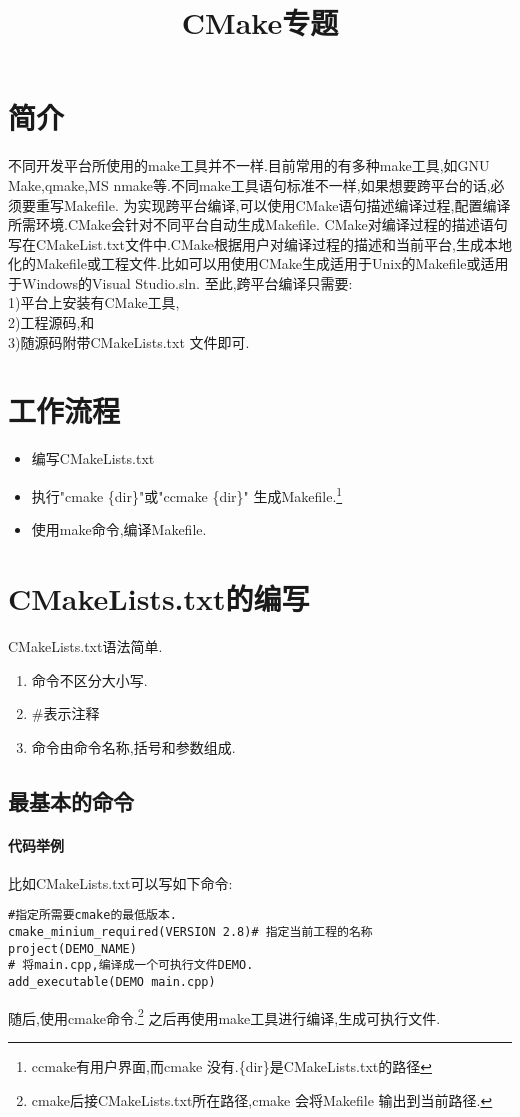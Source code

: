 \documentclass{ctexart}
\begin{document}
	
\title{CMake专题}
\author{}
\maketitle
\section{简介}
不同开发平台所使用的make工具并不一样.目前常用的有多种make工具,如GNU Make,qmake,MS nmake等.不同make工具语句标准不一样,如果想要跨平台的话,必须要重写Makefile.
为实现跨平台编译,可以使用CMake语句描述编译过程,配置编译所需环境.CMake会针对不同平台自动生成Makefile.
CMake对编译过程的描述语句写在CMakeList.txt文件中.CMake根据用户对编译过程的描述和当前平台,生成本地化的Makefile或工程文件.比如可以用使用CMake生成适用于Unix的Makefile或适用于Windows的Visual Studio.sln.
至此,跨平台编译只需要:\\
1)平台上安装有CMake工具,\\
2)工程源码,和\\
3)随源码附带CMakeLists.txt 文件即可.
\section{工作流程}
\begin{itemize}
\item 编写CMakeLists.txt
\item 执行"cmake \{dir\}"或"ccmake \{dir\}" 生成Makefile.\footnote{ccmake有用户界面,而cmake 没有.\{dir\}是CMakeLists.txt的路径}
\item 使用make命令,编译Makefile.
\end{itemize}

\section{CMakeLists.txt的编写}
CMakeLists.txt语法简单.
\begin{enumerate}
\item 命令不区分大小写.
\item \#表示注释
\item 命令由命令名称,括号和参数组成.
\end{enumerate}
\subsection{最基本的命令}
\paragraph{代码举例}
比如CMakeLists.txt可以写如下命令:
\begin{verbatim}
#指定所需要cmake的最低版本.
cmake_minium_required(VERSION 2.8)# 指定当前工程的名称
project(DEMO_NAME)
# 将main.cpp,编译成一个可执行文件DEMO.
add_executable(DEMO main.cpp)
\end{verbatim}
随后,使用cmake命令.\footnote{cmake后接CMakeLists.txt所在路径,cmake 会将Makefile 输出到当前路径.}
之后再使用make工具进行编译,生成可执行文件.
\end{document}
